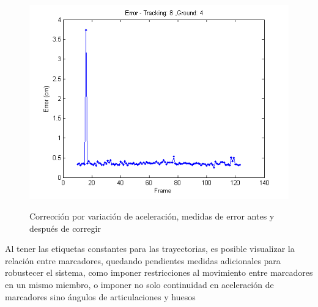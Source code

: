 \begin{figure}[H]
{	\includegraphics[scale=0.5]{img/Tracking/038_Salida_Tracking_Error_Marker_8_original.png}}
\caption{Corrección por variación de aceleración, medidas de error antes y después de corregir}
\label{Tracking_Original_Filtrado_Errores}
\end{figure}



Al tener las etiquetas constantes para las trayectorias, es posible visualizar la relación entre marcadores, quedando pendientes medidas adicionales para robustecer el sistema, como imponer restricciones al movimiento entre marcadores en un mismo miembro, o imponer no solo continuidad en aceleración de marcadores sino ángulos de articulaciones y huesos

